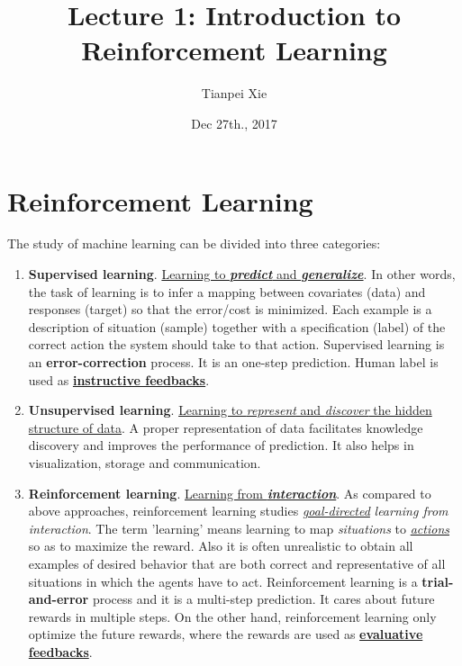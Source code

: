 \documentclass[11pt]{article}
\begin{document}
\title{Lecture 1: Introduction to Reinforcement Learning}
\author{ Tianpei Xie}
\date{ Dec 27th., 2017 }
\maketitle
\tableofcontents
\newpage
\section{Reinforcement Learning}
The study of machine learning can be divided into three categories:
\begin{enumerate}
\item \textbf{Supervised learning}.  \underline{Learning to \emph{\textbf{predict}} and \emph{\textbf{generalize}}}. In other words, the task of learning is to infer a mapping between covariates (data) and responses (target) so that the error/cost is minimized. Each example is a description of situation (sample) together with a specification (label) of the correct action the system should take to that action. Supervised learning is an \textbf{error-correction} process. It is an one-step prediction. Human label is used as  \underline{\textbf{instructive feedbacks}}. 

\item \textbf{Unsupervised learning}.  \underline{Learning to \emph{represent} and \emph{discover} the  hidden structure of data}. A proper representation of data facilitates knowledge discovery and improves the performance of prediction. It also helps in visualization, storage and communication. 

\item \textbf{Reinforcement learning}. \underline{Learning from \emph{\textbf{interaction}}}. As compared to above approaches,  reinforcement learning studies \underline{\emph{goal-directed}} \emph{learning from interaction}. The term 'learning' means learning to map \emph{situations} to  \underline{\emph{actions}} so as to maximize the reward. Also it is often unrealistic to obtain all examples of desired behavior that are both correct and representative of all situations in which the agents have to act. Reinforcement learning is a \textbf{trial-and-error} process and it is a multi-step prediction. It cares about future rewards in multiple steps. On the other hand, reinforcement learning only optimize the future rewards, where the rewards are used as  \underline{\textbf{evaluative feedbacks}}.  
\end{enumerate}
\end{document}
